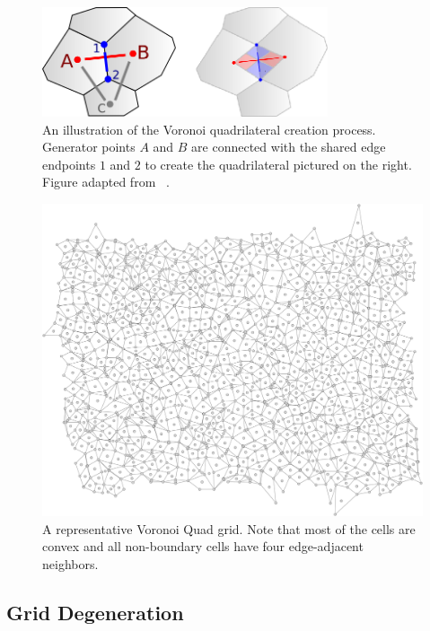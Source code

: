 \documentclass[a4paper,11pt]{article}
\begin{document}
\begin{figure}[htp]
\centering
\includegraphics[width=0.75\textwidth]{ch3_figs/vquad_generation}
\caption[Voronoi Quad Generation]{
	An illustration of the Voronoi quadrilateral creation process. Generator points $A$ and $B$ are connected with the shared edge endpoints $1$ and $2$ to create the quadrilateral pictured on the right. Figure adapted from \citeauthor{am10}~\cite{am10}. 
}
\label{fig:vquad_gen}
\end{figure}

\begin{figure}[htp]
\centering
\includegraphics[width=1.0\textwidth]{ch3_figs/vquad_stoma_v2}
\caption[Voronoi Quad Grid]{
  A representative Voronoi Quad grid. Note that most of the cells are convex and all non-boundary cells have four  edge-adjacent neighbors.
}
\label{fig:vquad_grid}
\end{figure}

\subsection{Grid Degeneration}
\end{document}
